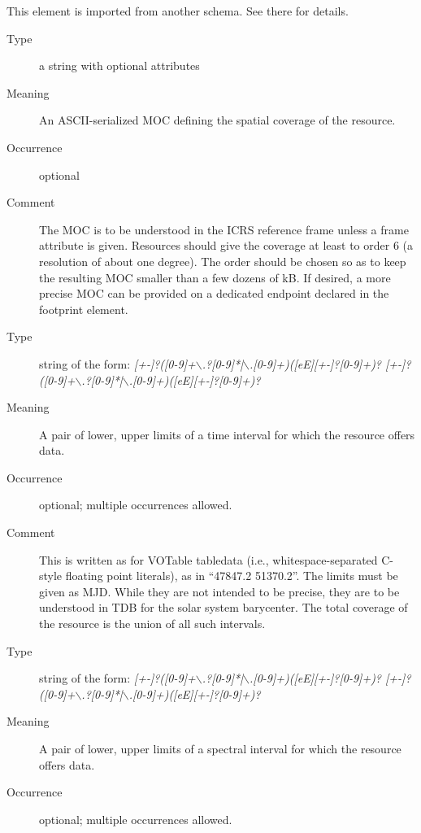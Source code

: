 \documentclass[11pt,a4paper]{ivoa}
\begin{document}
\begin{generated}
\begin{bigdescription}
This element is imported from another schema.  See
            there for details.\item[Element \xmlel{spatial}]
\begin{description}
\item[Type] a string with optional attributes
\item[Meaning] An ASCII-serialized MOC defining the spatial coverage
                  of the resource.
\item[Occurrence] optional
\item[Comment] The MOC is to be understood in the ICRS reference frame
                  unless a frame attribute is given.
                  Resources should give the coverage at least to order 6
                  (a resolution of about one degree).  The order should be
                  chosen so as to keep the resulting MOC smaller than a few
                  dozens of kB.  If desired, a more precise MOC can be provided
                  on a dedicated endpoint declared in the footprint element.

\end{description}
\item[Element \xmlel{temporal}]
\begin{description}
\item[Type] string of the form: \emph{[+-]?([0-9]+$\backslash$.?[0-9]*|$\backslash$.[0-9]+)([eE][+-]?[0-9]+)? [+-]?([0-9]+$\backslash$.?[0-9]*|$\backslash$.[0-9]+)([eE][+-]?[0-9]+)?}
\item[Meaning] A pair of lower, upper limits of a time interval
                  for which the resource offers data.
\item[Occurrence] optional; multiple occurrences allowed.

\item[Comment] This is written as for VOTable tabledata (i.e.,
                  whitespace-separated C-style floating point literals), as
                  in “47847.2 51370.2”.
                  The limits must be given as MJD.  While they
                  are not intended to be precise, they are to be understood
                  in TDB for the solar system barycenter.  The total coverage
                  of the resource is the union of all such intervals.

\end{description}
\item[Element \xmlel{spectral}]
\begin{description}
\item[Type] string of the form: \emph{[+-]?([0-9]+$\backslash$.?[0-9]*|$\backslash$.[0-9]+)([eE][+-]?[0-9]+)? [+-]?([0-9]+$\backslash$.?[0-9]*|$\backslash$.[0-9]+)([eE][+-]?[0-9]+)?}
\item[Meaning] A pair of lower, upper limits of a spectral interval
                  for which the resource offers data.
\item[Occurrence] optional; multiple occurrences allowed.


\end{description}
\end{bigdescription}
\end{generated}
\end{document}
